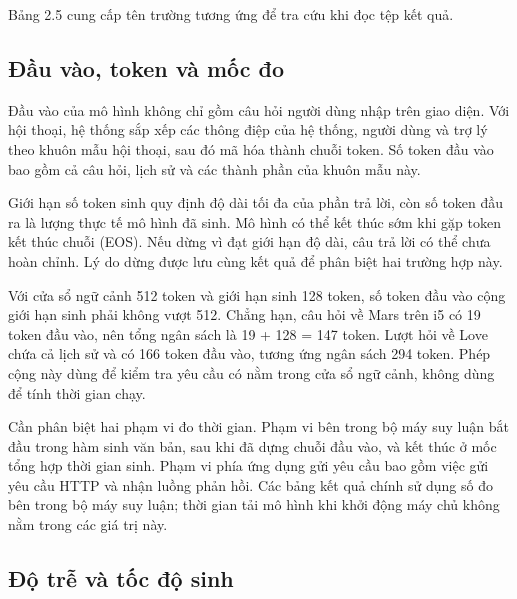 Bảng 2.5 cung cấp tên trường tương ứng để tra cứu khi đọc tệp kết quả.

\subsection{Đầu vào, token và mốc đo}

Đầu vào của mô hình không chỉ gồm câu hỏi người dùng nhập trên giao diện. Với hội thoại, hệ thống sắp xếp các thông điệp của hệ thống, người dùng và trợ lý theo khuôn mẫu hội thoại, sau đó mã hóa thành chuỗi token. Số token đầu vào bao gồm cả câu hỏi, lịch sử và các thành phần của khuôn mẫu này.

Giới hạn số token sinh quy định độ dài tối đa của phần trả lời, còn số token đầu ra là lượng thực tế mô hình đã sinh. Mô hình có thể kết thúc sớm khi gặp token kết thúc chuỗi (EOS). Nếu dừng vì đạt giới hạn độ dài, câu trả lời có thể chưa hoàn chỉnh. Lý do dừng được lưu cùng kết quả để phân biệt hai trường hợp này.

Với cửa sổ ngữ cảnh 512 token và giới hạn sinh 128 token, số token đầu vào cộng giới hạn sinh phải không vượt 512. Chẳng hạn, câu hỏi về Mars trên i5 có 19 token đầu vào, nên tổng ngân sách là 19 + 128 = 147 token. Lượt hỏi về Love chứa cả lịch sử và có 166 token đầu vào, tương ứng ngân sách 294 token. Phép cộng này dùng để kiểm tra yêu cầu có nằm trong cửa sổ ngữ cảnh, không dùng để tính thời gian chạy.

Cần phân biệt hai phạm vi đo thời gian. Phạm vi bên trong bộ máy suy luận bắt đầu trong hàm sinh văn bản, sau khi đã dựng chuỗi đầu vào, và kết thúc ở mốc tổng hợp thời gian sinh. Phạm vi phía ứng dụng gửi yêu cầu bao gồm việc gửi yêu cầu HTTP và nhận luồng phản hồi. Các bảng kết quả chính sử dụng số đo bên trong bộ máy suy luận; thời gian tải mô hình khi khởi động máy chủ không nằm trong các giá trị này.

\subsection{Độ trễ và tốc độ sinh}

